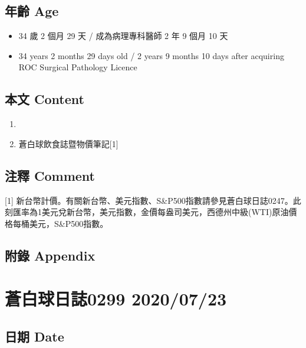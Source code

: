 \documentclass[a5paper, 11pt
]{book}
\providecommand{\tightlist}{%
  \setlength{\itemsep}{0pt}\setlength{\parskip}{0pt}}
\begin{document}
\hypertarget{ux5e74ux9f61-age-51}{%
\subsection{年齡 Age}\label{ux5e74ux9f61-age-51}}

\begin{itemize}
\tightlist
\item
  34 歲 2 個月 29 天 / 成為病理專科醫師 2 年 9 個月 10 天
\item
  34 years 2 months 29 days old / 2 years 9 months 10 days after
  acquiring ROC Surgical Pathology Licence
\end{itemize}

\hypertarget{ux672cux6587-content-51}{%
\subsection{本文 Content}\label{ux672cux6587-content-51}}

\begin{enumerate}
\def\labelenumi{\arabic{enumi}.}
\tightlist
\item
\item
  蒼白球飲食誌暨物價筆記{[}1{]}
\end{enumerate}

\hypertarget{ux6ce8ux91cb-comment-51}{%
\subsection{注釋 Comment}\label{ux6ce8ux91cb-comment-51}}

{[}1{]}
新台幣計價。有關新台幣、美元指數、S\&P500指數請參見蒼白球日誌0247。此刻匯率為1美元兌新台幣，美元指數，金價每盎司美元，西德州中級(WTI)原油價格每桶美元，S\&P500指數。

\hypertarget{ux9644ux9304-appendix-51}{%
\subsection{附錄 Appendix}\label{ux9644ux9304-appendix-51}}

\hypertarget{ux84bcux767dux7403ux65e5ux8a8c0299-20200723}{%
\section{蒼白球日誌0299
2020/07/23}\label{ux84bcux767dux7403ux65e5ux8a8c0299-20200723}}

\hypertarget{ux65e5ux671f-date-52}{%
\subsection{日期 Date}\label{ux65e5ux671f-date-52}}
\end{document}
